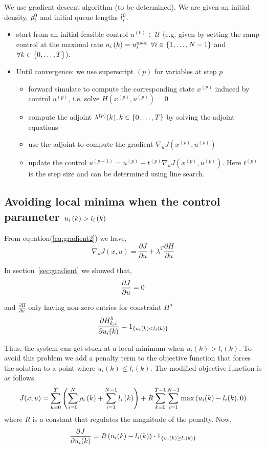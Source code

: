 
We use gradient descent algorithm (to be determined). We are given an initial  density, $\rho_{i}^{0}$ and initial queue lengths $l_{i}^{0}$.
\begin{itemize}
\item start from an initial feasible control $u^{(0)} \in \mathcal{U}$ (e.g. given by  setting the ramp control at the maximal rate $u_{i}\left(k\right) = u_{i}^{\max}$ $\forall i \in \{1, \dots, N-1\}$ and $\forall k \in \{0, \dots, T\}$).
\item Until convergence: we use superscript $(p)$ for variables at step $p$
\begin{itemize}
\item forward simulate to compute the corresponding state $x^{(p)}$ induced by control $u^{(p)}$, i.e. solve $H(x^{(p)}, u^{(p)}) = 0$
\item compute the adjoint $\lambda^{(p)}(k), k \in \{0, \dots, T \}$ by solving the adjoint equations
\item use the adjoint to compute the gradient $\nabla_u J(x^{(p)}, u^{(p)})$
\item update the control $u^{(p+1)} = u^{(p)} - t^{(p)} \nabla_u J(x^{(p)}, u^{(p)})$. Here $t^{(p)}$ is the step size and can be determined using line search.
\end{itemize}
\end{itemize}

\subsection{Avoiding local minima when the control parameter $u_{i}\left(k\right) > l_{i}\left(k\right)$}

From equation(\ref{eq:gradient2}) we have,
\[
\nabla_u J(x,u) = \frac{\partial J}{\partial u} + \lambda^T\frac{\partial H}{\partial u}
\]

\noindent In section~\ref{sec:gradient} we showed that,
\[
\frac{\partial J}{\partial u} = 0 \\
\]

\noindent and $\frac{\partial H}{\partial u}$ only having non-zero entries for constraint $H^5$ 
\[
\frac{\partial H^5_{k, i}}{\partial u_i(k)} = 1_{\left\{u_{i}\left(k\right) < l_{i}\left(k\right)\right\}}
\]

\noindent Thus, the system can get stuck at a local minimum when $u_i(k) > l_i(k)$. To avoid this problem we add a penalty term to the objective function that forces the solution to a point where $u_i(k) \le l_i(k)$. The modified objective function is as follows.
\[
J(x, u) = \sum_{k = 0}^{T} \left( \sum_{i = 0}^{N} \rho_{i}\left(k\right) + \sum_{i = 1}^{N - 1}  l_{i}\left(k\right) \right) + 
R \sum_{k = 0}^{T-1} \sum_{i = 1}^{N - 1} \max{(u_i(k)-l_i(k),0)}
\]
where $R$ is a constant that regulates the magnitude of the penalty. Now,
\[
\frac{\partial J}{\partial u_i(k)} = R\left( u_i(k) - l_i(k) \right) \cdot 1_{\left\{u_i(k) \ge l_i(k)\right\}}
\]






